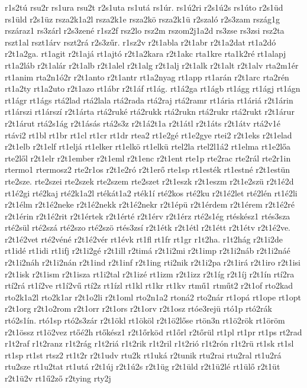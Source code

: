 {r1s2tú
rsu2r
rs1ura
rsu2t
r2s1uta
rs1utá
rs1úr.
rs1ú2ri
r2s1ú2s
rs1úto
r2s1üd
rs1üld
r2s1üz
rsza2k1a2l
rsza2k1e
rsza2kö
rsza2k1ü
r2szaló
r2s3zam
rszág1g
rszáraz1
rs3zárl
r2s3zené
r1sz2f
rsz2lo
rsz2m
rszom2j1a2d
rs3zse
rs3zsi
rsz2ta
rszt1al
rszt1árv
rszt2rá
r2s3zűr.
r1sz2v
r2t1abla
r2t1abr
r2t1a2dat
rt1a2dó
r2t1a2ga.
rt1agit
r2t1ajá
rt1ajtó
r2t1a2kara
r2t1akc
rta1kre
rta1k2ré
rt1alapj
rt1a2láb
r2t1alár
r2t1alb
r2t1alel
r2t1alg
r2t1alj
r2t1alk
r2t1alt
r2t1alv
rta2m1ér
rt1anim
rta2n1ó2r
r2t1anto
r2t1antr
rt1a2nyag
rt1app
rt1arán
r2t1arc
rta2rén
rt1a2ty
rt1a2uto
r2t1azo
rt1ábr
r2t1áf
rt1ág.
rt1á2ga
rt1ágb
rt1ágg
rt1ágj
rt1ágn
rt1ágr
rt1ágs
rtá2lad
rtá2lala
rtá2rada
rtá2raj
rtá2ramr
rt1ária
rt1áriá
r2t1árin
rt1árszi
rt1árszí
r2t1árta
rtá2ruké
rtá2rukk
rtá2rukn
rtá2rukr
rtá2rukt
r2t1árur
r2t1árut
rtá2s1ág
r2t1ásás
rtá2s3z
r2t1á2t1a
r2t1átl
r2t1áts
r2t1átv
rtá2v1é
rtávi2
rt1bl
rt1br
rt1cl
rt1cr
rt1dr
rtea2
rt1e2gé
rt1e2gye
rtei2
r2t1eks
r2t1elad
r2t1elb
r2t1elf
rt1eljá
rt1elker
rt1elkö
rt1elkü
rtel2la
rtel2l1á2
rt1elma
rt1e2lőa
rte2lől
r2t1elr
r2t1ember
r2t1eml
r2t1enc
r2t1ent
rte1p
rte2rac
rte2rál
rte2r1in
rtermo1
rtermosz2
rte2r1os
r2t1e2ró
r2t1erő
rte1sp
rt1esték
rt1estné
r2t1estün
rte2sze.
rte2szei
rte2szek
rte2szem
rte2szet
r2t1eszk
r2t1eszm
r2t1e2szü
r2t1é2d
rt1é2gi
rté2kaj
rté2k1a2l
rtékát1a2
rték1í
rté2kos
rté2ku
r2t1é2let
rté2lén
rt1é2li
r2t1élm
r2t1é2neke
r2t1é2nekk
r2t1é2nekr
r2t1épü
r2t1érdem
r2t1érem
r2t1é2ré
r2t1érin
r2t1é2rit
r2t1értek
r2t1érté
r2t1érv
r2t1érz
rté2s1ég
rtéskész1
rtés3sza
rté2sül
rté2szá
rté2szo
rté2szö
rtés3zsí
r2t1étk
r2t1étl
r2t1étt
r2t1étv
r2t1é2ve.
r2t1é2vet
rté2véné
r2t1é2vér
rt1évk
rt1fl
rt1fr
rt1gr
r1t2ha.
r1t2hág
r2t1i2de
rt1idé
rt1idi
rt1ifj
r2t1i2gé
r2t1ill
r2timá
r2t1i2mi
r2t1imp
r2t1i2náb
r2t1i2náé
r2t1i2náh
r2t1i2nán
r2t1ind
r2t1inf
r2t1ing
rti2nik
r2t1i2pa
r2t1irá
r2t1iro
r2t1isi
r2t1isk
r2t1ism
r2t1isza
rt1i2tal
r2t1izé
rt1izm
r2t1izz
r2t1íg
r2t1íj
r2t1ín
rtí2ra
rtí2rá
rt1í2ve
rt1í2vű
rtí2z
rt1ízl
rt1kl
rt1kr
rt1kv
rtmű1
rtműt2
r2t1of
rto2kad
rto2k1a2l
rto2k1ar
r2t1o2li
r2t1oml
rto2n1a2
rtoná2
rto2nár
rt1opá
rt1ope
rt1opt
r2t1org
r2t1o2rom
r2t1orr
r2t1ors
r2t1orv
r2t1osz
rtóe3rejü
rtó1p
rtó2rák
rtó2s1ín.
rtó1sp
rtó2s3zár
r2t1ökl
rt1ököl
r2t1ö2lőse
rtön3n
rt1ö2rök
rt1öröm
r2t1össz
rt1ö2vez
rtőé2h
rtőkész1
r2t1őrköd
rt1őrl
r2tőrül
rt1pl
rt1pr
rt1ps
rt2rad
r1t2raf
r1t2ranz
r1t2rág
r1t2riá
r1t2rik
r1t2ril
r1t2rió
r1t2rón
r1t2rü
rt1sk
rt1sl
rt1sp
rt1st
rtsz2
rt1t2r
r2t1udv
rtu2k
rt1uká
r2tunik
rtu2rai
rtu2ral
rt1u2rá
rtu2sze
rt1u2tat
rt1utá
r2t1új
r2t1ú2s
r2t1üg
r2t1üld
r2t1ü2lé
rt1ülő
r2t1üt
r2t1ü2v
rt1ű2ző
r2tying
rty2j
}
